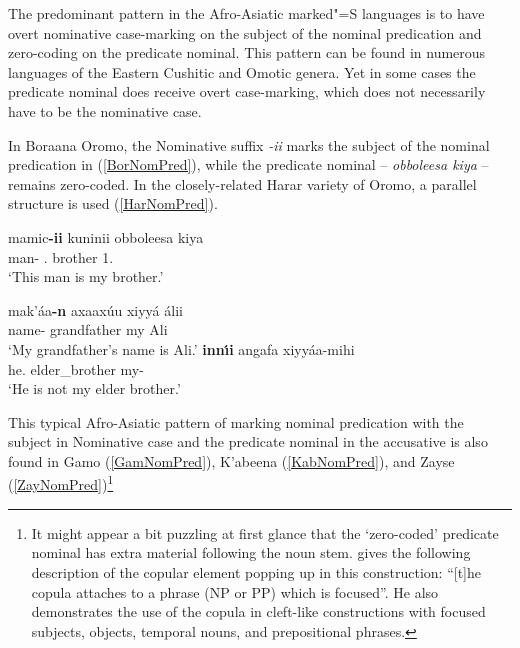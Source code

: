 The predominant pattern in the Afro-Asiatic marked"=S languages is to have overt nominative case-marking on the subject of the nominal predication and zero-coding on the predicate nominal. 
This pattern can be found in numerous languages of the Eastern Cushitic and Omotic genera.
Yet in some cases the predicate nominal does receive overt case-marking, which does not necessarily have to be the nominative case. 

In Boraana Oromo, the Nominative suffix \emph{-ii} marks the subject of the nominal predication in (\ref{BorNomPred}), while the predicate nominal -- \emph{obboleesa kiya} -- remains zero-coded. 
In the closely-related Harar variety of Oromo, a parallel structure is used (\ref{HarNomPred}). 


\begin{exe}\ex\label{BorNomPred}
\gll mamic\textbf{-ii} kuninii obboleesa kiya\\
man-\nom{} \dem{}.\nom{} brother 1\sg{}.\poss{}\\
\glt `This man is my brother.' \end{exe}

\begin{exe}\ex\label{HarNomPred}
\begin{xlist}\ex\gll mak'\'aa\textbf{-n} axaax\'uu xiyy\'a \'alii\\
name-\nom{} grandfather my Ali\\
\glt `My grandfather's name is Ali.'
\ex \gll \textbf{inn\'\i i} angafa xiyy\'aa-mihi\\
he.\nom{} {elder\_brother} my-\Neg{}\\
\glt `He is not my elder brother.'
\end{xlist}
\end{exe}

This typical Afro-Asiatic pattern of marking nominal predication with the subject in Nominative case  and the predicate nominal in the accusative is also found in Gamo (\ref{GamNomPred}), K'abeena (\ref{KabNomPred}), and Zayse (\ref{ZayNomPred})\footnote{It might appear a bit puzzling at first glance that the `zero-coded' predicate nominal has extra material following the noun stem. 
\citet[280--281]{Hayward:1990} gives the following description of the copular element popping up in this construction: ``[t]he copula attaches to a phrase (NP or PP) which is focused''. 
He also demonstrates the use of the copula in cleft-like constructions with focused subjects, objects, temporal nouns, and prepositional phrases.}

